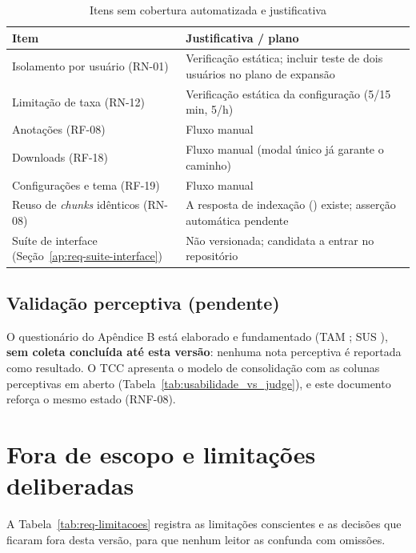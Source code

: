 \begin{table}[H]
\centering
\setlength{\tabcolsep}{3pt}
\caption{Itens sem cobertura automatizada e justificativa}
\label{tab:req-sem-cobertura}
\begin{tabularx}{\textwidth}{|L{5.4cm}|Y|}
\hline
\textbf{Item} & \textbf{Justificativa / plano} \\
\hline
Isolamento por usuário (RN-01) & Verificação estática; incluir teste de dois usuários no plano de expansão \\
\hline
Limitação de taxa (RN-12) & Verificação estática da configuração (5/15 min, 5/h) \\
\hline
Anotações (RF-08) & Fluxo manual \\
\hline
Downloads (RF-18) & Fluxo manual (modal único já garante o caminho) \\
\hline
Configurações e tema (RF-19) & Fluxo manual \\
\hline
Reuso de \emph{chunks} idênticos (RN-08) & A resposta de indexação (\texttt{}) existe; asserção automática pendente \\
\hline
Suíte de interface (Seção~\ref{ap:req-suite-interface}) & Não versionada; candidata a entrar no repositório \\
\hline
\end{tabularx}
\end{table}

\subsection{Validação perceptiva (pendente)}
\label{ap:req-validacao-perceptiva}

O questionário do Apêndice B está elaborado e fundamentado (TAM \cite{davis_1989}; SUS \cite{brooke_1996}), \textbf{sem coleta concluída até esta versão}: nenhuma nota perceptiva é reportada como resultado. O TCC apresenta o modelo de consolidação com as colunas perceptivas em aberto (Tabela~\ref{tab:usabilidade_vs_judge}), e este documento reforça o mesmo estado (RNF-08).

\section{Fora de escopo e limitações deliberadas}
\label{ap:req-limitacoes}

A Tabela~\ref{tab:req-limitacoes} registra as limitações conscientes e as decisões que ficaram fora desta versão, para que nenhum leitor as confunda com omissões.

